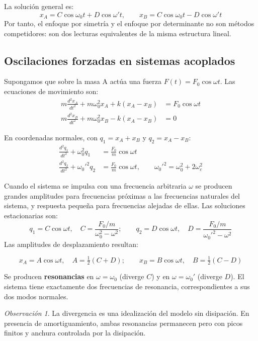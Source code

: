 \documentclass[12pt, a4paper]{article}
\theoremstyle{plain}
\theoremstyle{definition}
\theoremstyle{remark}
\newtheorem*{observacion}{Observación}
\begin{document}
La solución general es:
\begin{equation}
  x_A = C\cos\omega_0 t + D\cos\omega' t,\qquad
  x_B = C\cos\omega_0 t - D\cos\omega' t
\end{equation}
Por tanto, el enfoque por simetría y el enfoque por determinante no son métodos
competidores: son dos lecturas equivalentes de la misma estructura lineal.
\subsection{Oscilaciones forzadas en sistemas acoplados}

Supongamos que sobre la masa A actúa una fuerza $F(t) = F_0\cos\omega t$. Las ecuaciones
de movimiento son:
\begin{align}
  m\frac{d^2x_A}{dt^2} + m\omega_0^2 x_A + k(x_A-x_B) &= F_0\cos\omega t \\
  m\frac{d^2x_B}{dt^2} + m\omega_0^2 x_B - k(x_A-x_B) &= 0
\end{align}

En coordenadas normales, con $q_1 = x_A+x_B$ y $q_2 = x_A-x_B$:
\begin{align}
  \frac{d^2q_1}{dt^2} + \omega_0^2 q_1 &= \frac{F_0}{m}\cos\omega t \\
  \frac{d^2q_2}{dt^2} + \omega_0'^2 q_2 &= \frac{F_0}{m}\cos\omega t,
  \qquad \omega_0'^2 = \omega_0^2 + 2\omega_c^2
\end{align}

Cuando el sistema se impulsa con una frecuencia arbitraria $\omega$ se producen grandes
amplitudes para frecuencias próximas a las frecuencias naturales del sistema, y respuesta
pequeña para frecuencias alejadas de ellas. Las soluciones estacionarias son:
\begin{equation}
  q_1 = C\cos\omega t,\quad C = \frac{F_0/m}{\omega_0^2-\omega^2};
  \qquad
  q_2 = D\cos\omega t,\quad D = \frac{F_0/m}{\omega_0'^2-\omega^2}
\end{equation}
Las amplitudes de desplazamiento resultan:
\begin{mdframed}[style=resultado]
\begin{equation}
  x_A = A\cos\omega t,\quad A = \tfrac{1}{2}(C+D);
  \qquad
  x_B = B\cos\omega t,\quad B = \tfrac{1}{2}(C-D)
\end{equation}
\end{mdframed}

Se producen \textbf{resonancias} en $\omega = \omega_0$ (diverge $C$) y en
$\omega = \omega_0'$ (diverge $D$). El sistema tiene exactamente dos frecuencias de
resonancia, correspondientes a sus dos modos normales.
\begin{observacion}
La divergencia es una idealización del modelo sin disipación. En presencia de
amortiguamiento, ambas resonancias permanecen pero con picos finitos y anchura
controlada por la disipación.
\end{observacion}
\end{document}
